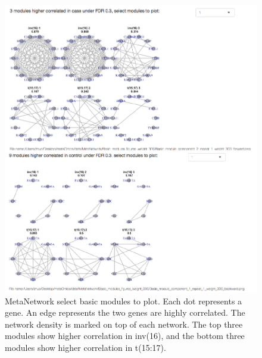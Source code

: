 \begin{figure}[H]
\begin{center}
\includegraphics[scale=0.7]{./figure/MetaNetwork/MetaNetworkBMplot.pdf}
\caption{MetaNetwork select basic modules to plot.
Each dot represents a gene.
An edge represents the two genes are highly correlated.
The network density is marked on top of each network.
The top three modules show higher correlation in inv(16), 
and the bottom three modules show higher correlation in t(15:17).
}
\label{fig:MetaNetworkBMplot}
\end{center}
\end{figure}
